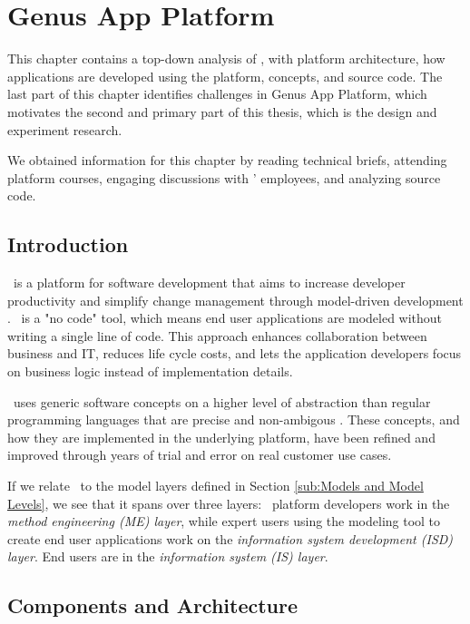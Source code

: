 \chapter{Genus App Platform}
\label{chap:gap}

This chapter contains a top-down analysis of \gap, with platform architecture, how applications are developed using the platform, concepts, and source code. The last part of this chapter identifies challenges in Genus App Platform, which motivates the second and primary part of this thesis, which is the design and experiment research.

We obtained information for this chapter by reading technical briefs, attending platform courses, engaging discussions with \genus' employees, and analyzing source code.


\clearpage
\section{Introduction}
\label{sec:Introduction}


\gap~is a platform for software development that aims to increase developer productivity and simplify change management through model-driven development \cite{Genus_AS2016-kt}. \gap~is a "no code" tool, which means end user applications are modeled without writing a single line of code. This approach enhances collaboration between business and IT, reduces life cycle costs, and lets the application developers focus on business logic instead of implementation details. 

\gap~uses generic software concepts on a higher level of abstraction than regular programming languages that are precise and non-ambigous \cite{noauthor_undated-qy}. These concepts, and how they are implemented in the underlying platform, have been refined and improved through years of trial and error on real customer use cases.

If we relate \gap~to the model layers defined in Section \ref{sub:Models and Model Levels}, we see that it spans over three layers: \gap~platform developers work in the \textit{method engineering (ME) layer}, while expert users using the modeling tool to create end user applications work on the \textit{information system development (ISD) layer}. End users are in the \textit{information system (IS) layer}.

\section{Components and Architecture}
\label{sec:Components and Architecture}


